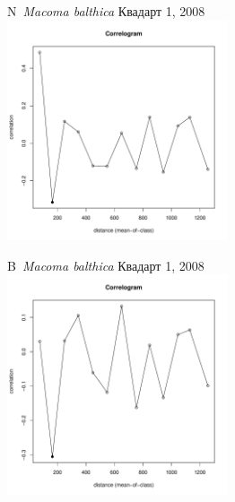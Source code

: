 	\begin{figure}[h]

	\begin{minipage}[b]{.46\linewidth}
	\begin{center}
	{\small N~{\it Macoma balthica} Квадарт 1, 2008}
		\includegraphics[width=65mm]{../Barenc_Sea/distribution_Moran/Plyazh081_moran_N_Macoma_balthica_.pdf}
	\end{center}
	\end{minipage}
%
	\hfil %
%
	\begin{minipage}[b]{.46\linewidth}
	\begin{center}
	{\small B~{\it Macoma balthica} Квадарт 1, 2008}
		\includegraphics[width=65mm]{../Barenc_Sea/distribution_Moran/Plyazh081_moran_B_Macoma_balthica_.pdf}
	\end{center}
	\end{minipage}


\end{figure}
